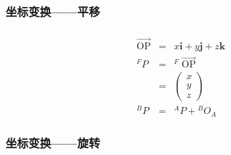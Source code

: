 \documentclass{beamer}
\newcommand{\tmmathbf}[1]{\ensuremath{\boldsymbol{#1}}}
\newcommand{\tmop}[1]{\ensuremath{\operatorname{#1}}}
\begin{document}
{{\begin{frame}
\end{frame}}{\begin{frame}
  \frametitle{坐标变换------平移}
  
\end{frame}}{\begin{frame}
  \frametitle{}
  \begin{eqnarray*}
    \overrightarrow{\tmop{OP}} & = & x\tmmathbf{i}+ y\tmmathbf{j}+
    z\tmmathbf{k}\\
    {}^F P & = & {}^F \overrightarrow{\tmop{OP}}\\
    & = & \left(\begin{array}{c}
      x\\
      y\\
      z
    \end{array}\right)\\
    {}^B P & = & {}^A P + {}^B O_A
  \end{eqnarray*}
\end{frame}}{\begin{frame}
  \frametitle{坐标变换------旋转}
  
\end{frame}}{\begin{frame}
  

\end{frame}}}
\end{document}
